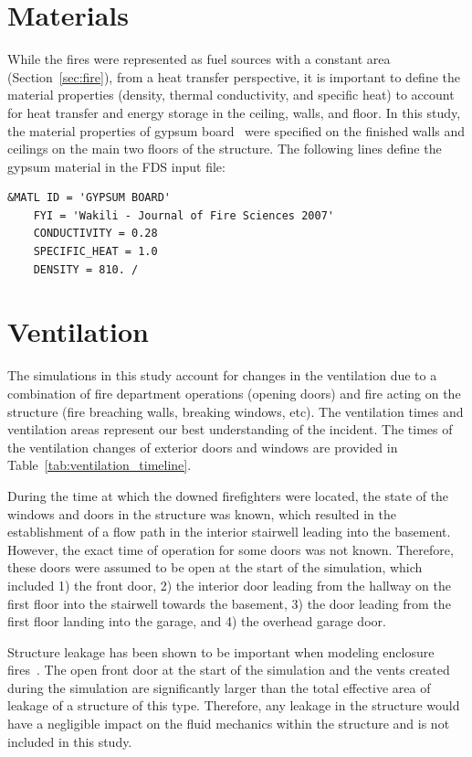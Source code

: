 \documentclass[12pt,oneside]{book}
\begin{document}
\section{Materials}
\label{sec:materials}

While the fires were represented as fuel sources with a constant area (Section~\ref{sec:fire}), from a heat transfer perspective, it is important to define the material properties (density, thermal conductivity, and specific heat) to account for heat transfer and energy storage in the ceiling, walls, and floor. In this study, the material properties of gypsum board~\cite{WAKILI2007} were specified on the finished walls and ceilings on the main two floors of the structure. The following lines define the gypsum material in the FDS input file:

\begin{lstlisting}
&MATL ID = 'GYPSUM BOARD'
    FYI = 'Wakili - Journal of Fire Sciences 2007' 
    CONDUCTIVITY = 0.28
    SPECIFIC_HEAT = 1.0
    DENSITY = 810. /
\end{lstlisting}

\section{Ventilation}
\label{sec:ventilation}

The simulations in this study account for changes in the ventilation due to a combination of fire department operations (opening doors) and fire acting on the structure (fire breaching walls, breaking windows, etc). The ventilation times and ventilation areas represent our best understanding of the incident. The times of the ventilation changes of exterior doors and windows are provided in Table~\ref{tab:ventilation_timeline}.

During the time at which the downed firefighters were located, the state of the windows and doors in the structure was known, which resulted in the establishment of a flow path in the interior stairwell leading into the basement. However, the exact time of operation for some doors was not known. Therefore, these doors were assumed to be open at the start of the simulation, which included 1) the front door, 2) the interior door leading from the hallway on the first floor into the stairwell towards the basement, 3) the door leading from the first floor landing into the garage, and 4) the overhead garage door.

Structure leakage has been shown to be important when modeling enclosure fires~\cite{beal2009}. The open front door at the start of the simulation and the vents created during the simulation are significantly larger than the total effective area of leakage of a structure of this type. Therefore, any leakage in the structure would have a negligible impact on the fluid mechanics within the structure and is not included in this study.
\end{document}
